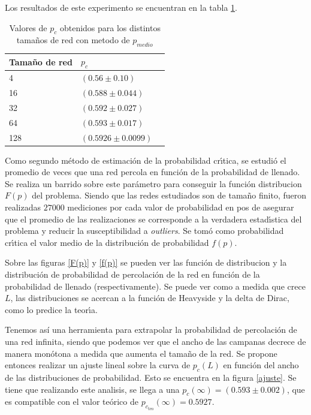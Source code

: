 \documentclass[
 reprint,
 amsmath,amssymb,
 aps,
]{revtex4-1}
\begin{document}
Los resultados de este experimento se encuentran en la tabla \ref{tabla_p_c}.

\begin{table}[h]
\caption{\label{tabla_p_c} Valores de $p_c$ obtenidos para los distintos tama\~nos de red con metodo de $p_{medio}$}
\begin{ruledtabular}
\begin{tabular}{lll}
\\[-5pt]
 Tama\~no de red     & $p_c$\\
\hline
4   &  $(0.56 \pm 0.10)$ \\
16  &  $(0.588 \pm 0.044)$ \\
32  &  $(0.592 \pm 0.027)$ \\
64  &  $(0.593 \pm 0.017)$ \\
128 &  $(0.5926 \pm 0.0099)$ \\

\end{tabular}
\end{ruledtabular}
\end{table}

Como segundo m\'etodo de estimaci\'on de la probabilidad cr\'\i tica, se estudi\'o el promedio de veces que una red percola en funci\'on de la probabilidad de llenado. Se realiza un barrido sobre este par\'ametro para conseguir la funci\'on distribucion $F(p)$ del problema. Siendo que las redes estudiados son de tama\~no finito, fueron realizadas $27000$ mediciones por cada valor de probabilidad en pos de asegurar que el promedio de las realizaciones se corresponde a la verdadera estad\'\i stica del problema y reducir la susceptibilidad a \emph{outliers}. Se tom\'o como probabilidad cr\'\i tica el valor medio de la distribuci\'on de probabilidad $f(p)$.

Sobre las figuras \ref{F(p)} y \ref{f(p)} se pueden ver las funci\'on de distribucion y la distribuci\'on de probabilidad de percolaci\'on de la red en funci\'on de la probabilidad de llenado (respectivamente). Se puede ver como a medida que crece $L$, las distribuciones se acercan a la funci\'on de Heavyside y la delta de Dirac, como lo predice la teor\'\i a.

Tenemos as\'i una herramienta para extrapolar la probabilidad de percolaci\'on de una red infinita, siendo que podemos ver que el ancho de las campanas decrece de manera mon\'otona a medida que aumenta el tama\~no de la red. Se propone entonces realizar un ajuste lineal sobre la curva de $p_c(L)$ en funci\'on del ancho de las distribuciones de probabilidad. Esto se encuentra en la figura \ref{ajuste}. Se tiene que realizando este analisis, se llega a una $p_c(\infty) = (0.593 \pm 0.002)$, que es compatible con el valor te\'orico de $p_c_\text{teo}(\infty) = 0.5927$.
\end{document}
